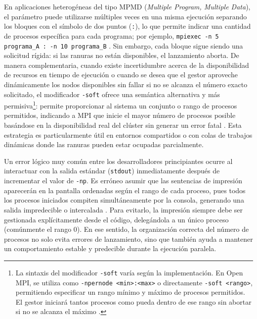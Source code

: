 En aplicaciones heterogéneas del tipo MPMD (\textit{Multiple Program, Multiple Data}), el parámetro puede utilizarse múltiples veces en una misma ejecución separando los bloques con el símbolo de dos puntos (\texttt{:}), lo que permite indicar una cantidad de procesos específica para cada programa; por ejemplo, \texttt{mpiexec -n 5 programa\_A : -n 10 programa\_B} \cite{mpi_forum_2025}. Sin embargo, cada bloque sigue siendo una solicitud rígida: si las ranuras no están disponibles, el lanzamiento aborta. De manera complementaria, cuando existe incertidumbre acerca de la disponibilidad de recursos en tiempo de ejecución o cuando se desea que el gestor aproveche dinámicamente los nodos disponibles sin fallar si no se alcanza el número exacto solicitado, el modificador \texttt{-soft} ofrece una semántica alternativa y más permisiva\footnote{La sintaxis del modificador \texttt{-soft} varía según la implementación. En Open MPI, se utiliza como \texttt{-npernode <min>:<max>} o directamente \texttt{-soft <rango>}, permitiendo especificar un rango mínimo y máximo de procesos permitidos. El gestor iniciará tantos procesos como pueda dentro de ese rango sin abortar si no se alcanza el máximo \cite{open_mpi_2026}.}: permite proporcionar al sistema un conjunto o rango de procesos permitidos, indicando a MPI que inicie el mayor número de procesos posible basándose en la disponibilidad real del clúster sin generar un error fatal \cite{mpi_forum_2025}. Esta estrategia es particularmente útil en entornos compartidos o con colas de trabajos dinámicas donde las ranuras pueden estar ocupadas parcialmente.

Un error lógico muy común entre los desarrolladores principiantes ocurre al interactuar con la salida estándar (\texttt{stdout}) inmediatamente después de incrementar el valor de \texttt{-np}. Es erróneo asumir que las sentencias de impresión aparecerán en la pantalla ordenadas según el rango de cada proceso, pues todos los procesos iniciados compiten simultáneamente por la consola, generando una salida impredecible o intercalada \cite{pacheco_2011}. Para evitarlo, la impresión siempre debe ser gestionada explícitamente desde el código, delegándola a un único proceso (comúnmente el rango 0). En ese sentido, la organización correcta del número de procesos no solo evita errores de lanzamiento, sino que también ayuda a mantener un comportamiento estable y predecible durante la ejecución paralela.
